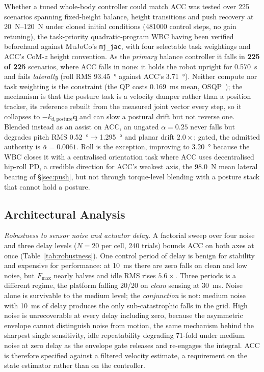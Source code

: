 \documentclass{jcd}
\begin{document}
Whether a tuned whole-body controller could match ACC was tested over 225
scenarios spanning fixed-height balance, height transitions and push recovery at
\SIrange{20}{120}{N} under cloned initial conditions (\num{481000} control
steps, no gain retuning), the task-priority quadratic-program WBC having been
verified beforehand against MuJoCo's \texttt{mj\_jac}, with four selectable task
weightings and ACC's CoM-$z$ height convention. As the \emph{primary} balance
controller it falls in \textbf{225 of 225} scenarios, where ACC falls in none: it
holds the robot upright for \SI{0.570}{s} and fails \emph{laterally} (roll RMS
\SI{93.45}{\degree} against ACC's \SI{3.71}{\degree}). Neither compute nor task weighting is the constraint (the QP costs \SI{0.169}{ms} mean, OSQP~\citep{stellato2020osqp}); the mechanism is that the posture task is a velocity damper rather than a position tracker, its
reference rebuilt from the measured joint vector every step, so it collapses to
$-k_{d,\text{posture}}\dot{\mathbf{q}}$ and can slow a postural drift but not
reverse one. Blended instead as an assist on ACC, an ungated $\alpha{=}0.25$ never falls but
degrades pitch RMS \SI{0.52}{\degree}$\rightarrow$\SI{1.295}{\degree} and planar
drift $\num{2.0}\times$; gated, the admitted authority is
$\bar\alpha{=}\num{0.0061}$. Roll is the exception, improving to
\SI{3.20}{\degree} because the WBC closes it with a centralised orientation task
where ACC uses decentralised hip-roll PD, a credible direction for ACC's weakest axis, the \SI{98.0}{N} mean lateral bearing of \S\ref{sec:push}, but
not through torque-level blending with a posture stack that cannot hold a
posture.


\subsection{Architectural Analysis}
\label{sec:analysis}

\emph{Robustness to sensor noise and actuator delay.} A factorial sweep over
four noise and three delay levels ($N{=}20$ per cell, \num{240} trials) bounds
ACC on both axes at once (Table~\ref{tab:robustness}). One control period of
delay is benign for stability and expensive for performance: at \SI{10}{ms} there
are zero falls on clean and low noise, but $F_{\max}$ nearly halves and idle RMS
rises $5.6{\times}$. Three periods is a different regime, the platform falling
\num{20}/\num{20} on \emph{clean} sensing at \SI{30}{ms}. Noise alone is
survivable to the medium level; the \emph{conjunction} is not: medium noise with \SI{10}{ms} of delay produces the only sub-catastrophic falls in the grid. High
noise is unrecoverable at every delay including zero, because the asymmetric
envelope cannot distinguish noise from motion, the same mechanism behind the sharpest single sensitivity, idle repeatability degrading \num{71}-fold under
medium noise at zero delay as the envelope gate releases and re-engages the
integral. ACC is therefore specified against a filtered velocity estimate, a
requirement on the state estimator rather than on the controller.
\end{document}
